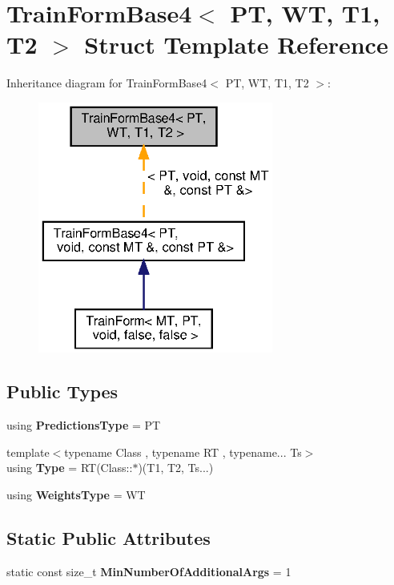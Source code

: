 \section{Train\+Form\+Base4$<$ PT, WT, T1, T2 $>$ Struct Template Reference}
\label{structmlpack_1_1cv_1_1TrainFormBase4}


Inheritance diagram for Train\+Form\+Base4$<$ PT, WT, T1, T2 $>$\+:
\nopagebreak
\begin{figure}[H]
\begin{center}
\leavevmode
\includegraphics[width=219pt]{structmlpack_1_1cv_1_1TrainFormBase4__inherit__graph}
\end{center}
\end{figure}
\subsection*{Public Types}
\begin{DoxyCompactItemize}
\item 
using \textbf{ Predictions\+Type} = PT
\item 
{\footnotesize template$<$typename Class , typename RT , typename... Ts$>$ }\\using \textbf{ Type} = RT(Class\+::$\ast$)(T1, T2, Ts...)
\item 
using \textbf{ Weights\+Type} = WT
\end{DoxyCompactItemize}
\subsection*{Static Public Attributes}
\begin{DoxyCompactItemize}
\item 
static const size\+\_\+t \textbf{ Min\+Number\+Of\+Additional\+Args} = 1
\end{DoxyCompactItemize}


